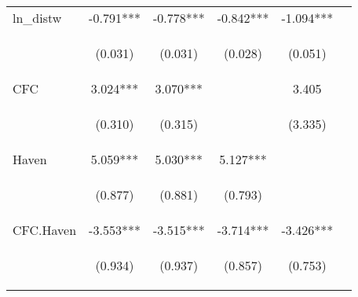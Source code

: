 \begin{center}
\begin{tabular}{lccccc}
ln\_distw & -0.791*** & -0.778*** & -0.842*** & -1.094*** &  \\
\vspace{4pt} & \begin{footnotesize}(0.031)\end{footnotesize} & \begin{footnotesize}(0.031)\end{footnotesize} & \begin{footnotesize}(0.028)\end{footnotesize} & \begin{footnotesize}(0.051)\end{footnotesize} & \begin{footnotesize}\end{footnotesize} \\
CFC & 3.024*** & 3.070*** &  & 3.405 &  \\
\vspace{4pt} & \begin{footnotesize}(0.310)\end{footnotesize} & \begin{footnotesize}(0.315)\end{footnotesize} & \begin{footnotesize}\end{footnotesize} & \begin{footnotesize}(3.335)\end{footnotesize} & \begin{footnotesize}\end{footnotesize} \\
Haven & 5.059*** & 5.030*** & 5.127*** &  &  \\
\vspace{4pt} & \begin{footnotesize}(0.877)\end{footnotesize} & \begin{footnotesize}(0.881)\end{footnotesize} & \begin{footnotesize}(0.793)\end{footnotesize} & \begin{footnotesize}\end{footnotesize} & \begin{footnotesize}\end{footnotesize} \\
CFC.Haven & -3.553*** & -3.515*** & -3.714*** & -3.426*** &  \\
\vspace{4pt} & \begin{footnotesize}(0.934)\end{footnotesize} & \begin{footnotesize}(0.937)\end{footnotesize} & \begin{footnotesize}(0.857)\end{footnotesize} & \begin{footnotesize}(0.753)\end{footnotesize} & \begin{footnotesize}\end{footnotesize} \\

\end{tabular}
\end{center}
